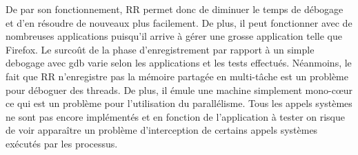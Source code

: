 De par son fonctionnement, RR permet donc de diminuer le temps de débogage et
d'en résoudre de nouveaux plus facilement. De plus, il peut fonctionner avec de
nombreuses applications puisqu'il arrive à gérer une grosse application telle
que Firefox. Le surcoût de la phase d'enregistrement par rapport à un simple
debogage avec gdb varie selon les applications et les tests
effectués. Néanmoins, le fait que RR n'enregistre pas la mémoire partagée en
multi-tâche est un problème pour déboguer des threads. De plus, il émule une
machine simplement mono-c\oe ur ce qui est un problème pour l'utilisation du
parallélisme. Tous les appels systèmes ne sont pas encore implémentés et en
fonction de l'application à tester on risque de voir apparaître un problème
d'interception de certains appels systèmes exécutés par les processus.
